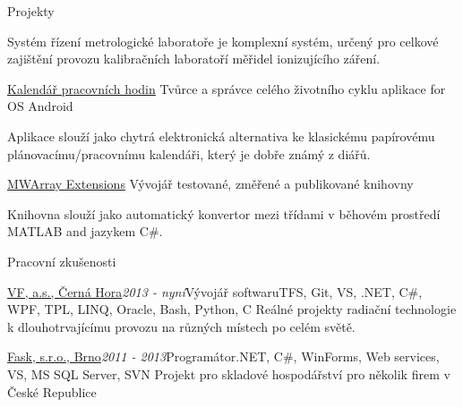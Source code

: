 \documentclass{cv} %
\begin{document}
\begin{rSection}{Projekty}
\begin{rSubsection}
Systém řízení metrologické laboratoře je komplexní systém, určený pro celkové zajištění provozu kalibračních laboratoří měřidel ionizujícího záření.
\end{rSubsection}

\begin{rSubsection}
{\href{https://play.google.com/store/apps/details?id=eu.jksoft.planningcalendar}{Kalendář pracovních hodin}}{}
{Tvůrce a správce celého životního cyklu aplikace for OS Android}{}

Aplikace slouží jako chytrá elektronická alternativa ke klasickému papírovému plánovacímu/pracovnímu kalendáři, který je dobře známý z diářů.
\end{rSubsection}

\begin{rSubsection}
{\href{http://honzakuzel.eu/mwarrayextensions.html}{MWArray Extensions}}{}
{Vývojář testované, změřené a publikované knihovny}{}

Knihovna slouží jako automatický konvertor mezi třídami v běhovém prostředí MATLAB and jazykem C\#.
\end{rSubsection}

\end{rSection}


\begin{rSection}{Pracovní zkušenosti}

\begin{rSubsection}{\href{https://www.vfnuclear.com/cz/}{VF, a.s., \v Cern\' a Hora}}{\em 2013 - nyní}{Vývojář softwaru}{TFS, Git, VS, .NET, C\#, WPF, TPL, LINQ, Oracle, Bash, Python, C}
Reálné projekty radiační technologie k dlouhotrvajícímu provozu na různých místech po celém světě.
\end{rSubsection}

\begin{rSubsection}{\href{http://www.fask.cz/}{Fask, s.r.o., Brno}}{\em 2011 - 2013}{Programátor}{.NET, C\#, WinForms, Web services, VS, MS SQL Server, SVN}
Projekt pro skladové hospodářství pro několik firem v České Republice
\end{rSubsection}

\end{rSection}
\end{document}

